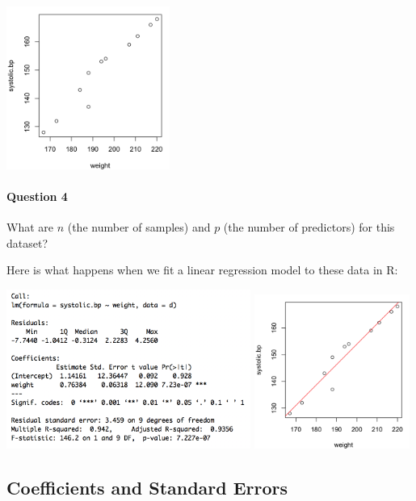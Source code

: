 \begin{center}
\includegraphics[width=0.4\textwidth]{img/systolic-bp-simple-plot.png}
\end{center}

\paragraph{Question 4} What are $n$ (the number of samples) and $p$ (the number of predictors) for this dataset?

\vspace{5mm}

Here is what happens when we fit a linear regression model to these data in R:
\begin{center}
\includegraphics[width=0.6\textwidth]{img/systolic-bp-simple-model.png}
\includegraphics[width=0.38\textwidth]{img/systolic-bp-simple-plot-wmodel.png}\end{center}

\subsection{Coefficients and Standard Errors}

